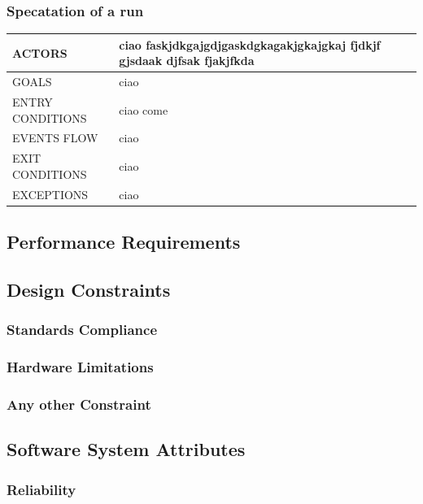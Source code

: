 \documentclass[a4paper]{article}
\begin{document}
\vspace{1cm}

\subsubsection{Specatation of a run}
\begin{center}
    \begin{tabular}{l || p{6cm} ||}
        ACTORS & ciao faskjdkgajgdjgaskdgkagakjgkajgkaj fjdkjf gjsdaak djfsak fjakjfkda \\ \hline
        GOALS & ciao \\ \hline
        ENTRY CONDITIONS & ciao come  \\ \hline
        EVENTS FLOW & ciao\\ \hline
        EXIT CONDITIONS & ciao\\ \hline
        EXCEPTIONS & ciao\\ \hline \hline
    \end{tabular}
\end{center}

\subsection{Performance Requirements}

\subsection{Design Constraints}

\subsubsection{Standards Compliance}

\subsubsection{Hardware Limitations}

\subsubsection{Any other Constraint}

\subsection{Software System Attributes}

\subsubsection{Reliability}
\end{document}

